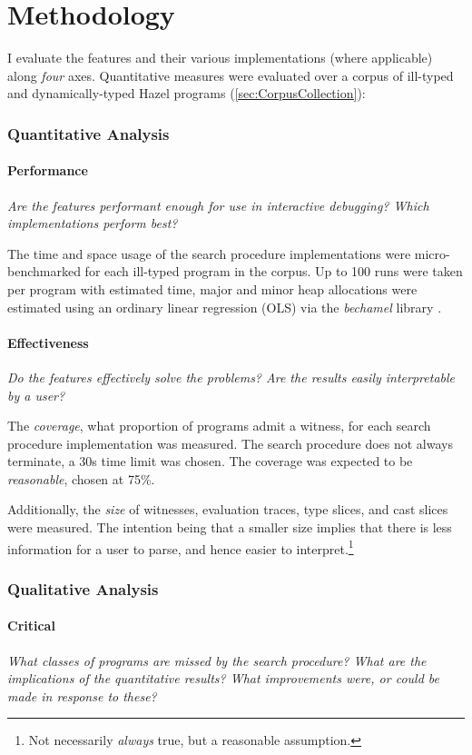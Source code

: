 \section{Methodology}\label{sec:EvaluationMethodology}
I evaluate the features and their various implementations (where applicable) along \textit{four} axes. Quantitative measures were evaluated over a corpus of ill-typed and dynamically-typed Hazel programs (\cref{sec:CorpusCollection}):

\subsubsection{Quantitative Analysis}
\paragraph{Performance} \textit{Are the features performant enough for use in interactive debugging? Which implementations perform best?}

The time and space usage of the search procedure implementations were micro-benchmarked for each ill-typed program in the corpus. Up to 100 runs were taken per program with estimated time, major and minor heap allocations were estimated using an ordinary linear regression (OLS) via the \textit{bechamel} library \cite{Bechamel}.

\paragraph{Effectiveness} \textit{Do the features effectively solve the problems? Are the results easily interpretable by a user?}

The \textit{coverage},  what proportion of programs admit a witness, for each search procedure implementation was measured. The search procedure does not always terminate, a 30s time limit was chosen. The coverage was expected to be \textit{reasonable}, chosen at 75\%.

Additionally, the \textit{size} of witnesses, evaluation traces, type slices, and cast slices were measured. The intention being that a smaller size implies that there is less information for a user to parse, and hence easier to interpret.\footnote{Not necessarily \textit{always} true, but a reasonable assumption.}

\subsubsection{Qualitative Analysis}
\paragraph{Critical} \textit{What \textit{classes} of programs are missed by the search procedure? What are the implications of the \textit{quantitative} results? What improvements were, or could be made in response to these?}

